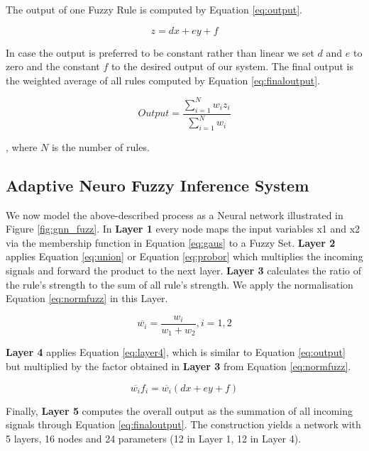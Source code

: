 The output of one Fuzzy Rule is computed by Equation \ref{eq:output}.


\begin{equation} \label{eq:output}
 z = dx + ey + f  \end{equation}
 
In case the output is preferred to be constant rather than linear we set $d$ and $e$ to zero and the constant  $f$ to the desired output of our system. The final output is the weighted average of all rules computed by Equation \ref{eq:finaloutput}.

\begin{equation} \label{eq:finaloutput}
Output = \frac { \sum\limits_{i=1}^N  w_i z_i} {\sum\limits_{i=1}^N  w_i } \end{equation}

, where $N$ is the number of rules. 

\subsection{Adaptive Neuro Fuzzy Inference System }

We now model the above-described process as a Neural network illustrated in Figure \ref{fig:gnn_fuzz}.  In \textbf{Layer 1} every node maps the input variables x1 and x2 via the membership function in Equation \ref{eq:gaus} to a Fuzzy Set.  \textbf{Layer 2} applies Equation \ref{eq:union} or Equation \ref{eq:probor} which multiplies the incoming signals and forward the product to the next layer. \textbf {Layer 3} calculates the ratio of the rule's strength to the sum of all rule's strength. We apply the normalisation Equation \ref{eq:normfuzz} in this Layer. 

\begin{equation} \label{eq:normfuzz}
\overline{w_i} =  \frac{w_i}{w_1 + w_2}, i = 1,2 \end{equation}

 \textbf{Layer 4} applies Equation \ref{eq:layer4}, which is similar to Equation \ref{eq:output} but multiplied by the factor obtained in \textbf{Layer 3} from Equation \ref{eq:normfuzz}. 
 
  \begin{equation} \label{eq:layer4}
 \overline{w_i} f_i =  \overline{w_i }(dx + ey + f) \end{equation}
 
 Finally, \textbf{Layer 5} computes the overall output as the summation of all incoming signals through Equation \ref{eq:finaloutput}. The construction yields a network with 5 layers,  16 nodes and 24 parameters (12 in Layer 1, 12 in Layer 4). 
 
